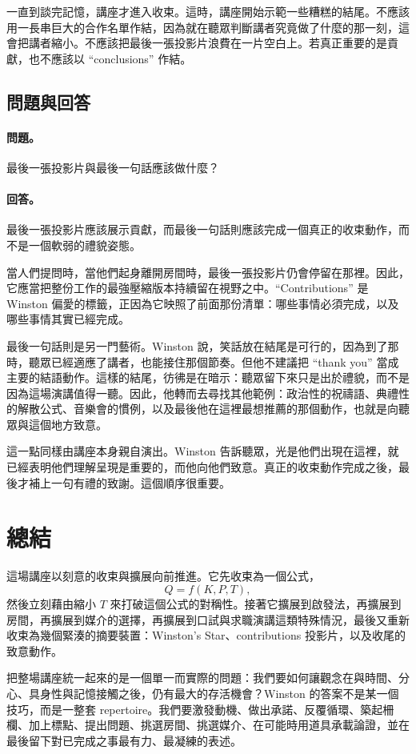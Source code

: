 一直到談完記憶，講座才進入收束。這時，講座開始示範一些糟糕的結尾。不應該用一長串巨大的合作名單作結，因為就在聽眾判斷講者究竟做了什麼的那一刻，這會把講者縮小。不應該把最後一張投影片浪費在一片空白上。若真正重要的是貢獻，也不應該以 ``conclusions'' 作結。

\subsection{問題與回答}

\paragraph{問題。} 最後一張投影片與最後一句話應該做什麼？

\paragraph{回答。} 最後一張投影片應該展示貢獻，而最後一句話則應該完成一個真正的收束動作，而不是一個軟弱的禮貌姿態。

當人們提問時，當他們起身離開房間時，最後一張投影片仍會停留在那裡。因此，它應當把整份工作的最強壓縮版本持續留在視野之中。``Contributions'' 是 Winston 偏愛的標籤，正因為它映照了前面那份清單：哪些事情必須完成，以及哪些事情其實已經完成。

最後一句話則是另一門藝術。Winston 說，笑話放在結尾是可行的，因為到了那時，聽眾已經適應了講者，也能接住那個節奏。但他不建議把 ``thank you'' 當成主要的結語動作。這樣的結尾，彷彿是在暗示：聽眾留下來只是出於禮貌，而不是因為這場演講值得一聽。因此，他轉而去尋找其他範例：政治性的祝禱語、典禮性的解散公式、音樂會的慣例，以及最後他在這裡最想推薦的那個動作，也就是向聽眾與這個地方致意。

這一點同樣由講座本身親自演出。Winston 告訴聽眾，光是他們出現在這裡，就已經表明他們理解呈現是重要的，而他向他們致意。真正的收束動作完成之後，最後才補上一句有禮的致謝。這個順序很重要。

\section{總結}

這場講座以刻意的收束與擴展向前推進。它先收束為一個公式，
\[
Q=f(K,P,T),
\]
然後立刻藉由縮小 \(T\) 來打破這個公式的對稱性。接著它擴展到啟發法，再擴展到房間，再擴展到媒介的選擇，再擴展到口試與求職演講這類特殊情況，最後又重新收束為幾個緊湊的摘要裝置：Winston's Star、contributions 投影片，以及收尾的致意動作。

把整場講座統一起來的是一個單一而實際的問題：我們要如何讓觀念在與時間、分心、具身性與記憶接觸之後，仍有最大的存活機會？Winston 的答案不是某一個技巧，而是一整套 repertoire。我們要激發動機、做出承諾、反覆循環、築起柵欄、加上標點、提出問題、挑選房間、挑選媒介、在可能時用道具承載論證，並在最後留下對已完成之事最有力、最凝練的表述。